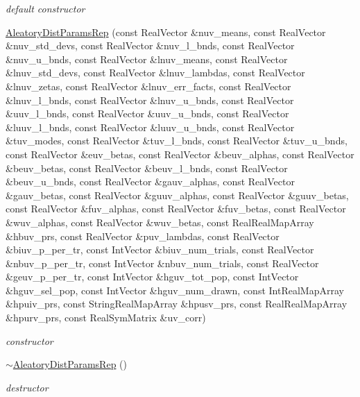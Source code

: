 \begin{DoxyCompactItemize}
\begin{DoxyCompactList}\small\item\em default constructor \end{DoxyCompactList}\item 
\hyperlink{classPecos_1_1AleatoryDistParamsRep_acd25dd647a0fe9a1288df63f751f122b}{Aleatory\+Dist\+Params\+Rep} (const Real\+Vector \&nuv\+\_\+means, const Real\+Vector \&nuv\+\_\+std\+\_\+devs, const Real\+Vector \&nuv\+\_\+l\+\_\+bnds, const Real\+Vector \&nuv\+\_\+u\+\_\+bnds, const Real\+Vector \&lnuv\+\_\+means, const Real\+Vector \&lnuv\+\_\+std\+\_\+devs, const Real\+Vector \&lnuv\+\_\+lambdas, const Real\+Vector \&lnuv\+\_\+zetas, const Real\+Vector \&lnuv\+\_\+err\+\_\+facts, const Real\+Vector \&lnuv\+\_\+l\+\_\+bnds, const Real\+Vector \&lnuv\+\_\+u\+\_\+bnds, const Real\+Vector \&uuv\+\_\+l\+\_\+bnds, const Real\+Vector \&uuv\+\_\+u\+\_\+bnds, const Real\+Vector \&luuv\+\_\+l\+\_\+bnds, const Real\+Vector \&luuv\+\_\+u\+\_\+bnds, const Real\+Vector \&tuv\+\_\+modes, const Real\+Vector \&tuv\+\_\+l\+\_\+bnds, const Real\+Vector \&tuv\+\_\+u\+\_\+bnds, const Real\+Vector \&euv\+\_\+betas, const Real\+Vector \&beuv\+\_\+alphas, const Real\+Vector \&beuv\+\_\+betas, const Real\+Vector \&beuv\+\_\+l\+\_\+bnds, const Real\+Vector \&beuv\+\_\+u\+\_\+bnds, const Real\+Vector \&gauv\+\_\+alphas, const Real\+Vector \&gauv\+\_\+betas, const Real\+Vector \&guuv\+\_\+alphas, const Real\+Vector \&guuv\+\_\+betas, const Real\+Vector \&fuv\+\_\+alphas, const Real\+Vector \&fuv\+\_\+betas, const Real\+Vector \&wuv\+\_\+alphas, const Real\+Vector \&wuv\+\_\+betas, const Real\+Real\+Map\+Array \&hbuv\+\_\+prs, const Real\+Vector \&puv\+\_\+lambdas, const Real\+Vector \&biuv\+\_\+p\+\_\+per\+\_\+tr, const Int\+Vector \&biuv\+\_\+num\+\_\+trials, const Real\+Vector \&nbuv\+\_\+p\+\_\+per\+\_\+tr, const Int\+Vector \&nbuv\+\_\+num\+\_\+trials, const Real\+Vector \&geuv\+\_\+p\+\_\+per\+\_\+tr, const Int\+Vector \&hguv\+\_\+tot\+\_\+pop, const Int\+Vector \&hguv\+\_\+sel\+\_\+pop, const Int\+Vector \&hguv\+\_\+num\+\_\+drawn, const Int\+Real\+Map\+Array \&hpuiv\+\_\+prs, const String\+Real\+Map\+Array \&hpusv\+\_\+prs, const Real\+Real\+Map\+Array \&hpurv\+\_\+prs, const Real\+Sym\+Matrix \&uv\+\_\+corr)\label{classPecos_1_1AleatoryDistParamsRep_acd25dd647a0fe9a1288df63f751f122b}

\begin{DoxyCompactList}\small\item\em constructor \end{DoxyCompactList}\item 
\hyperlink{classPecos_1_1AleatoryDistParamsRep_a711311aa35cf13e1d75314ec63852259}{$\sim$\+Aleatory\+Dist\+Params\+Rep} ()\label{classPecos_1_1AleatoryDistParamsRep_a711311aa35cf13e1d75314ec63852259}

\begin{DoxyCompactList}\small\item\em destructor \end{DoxyCompactList}\end{DoxyCompactItemize}
